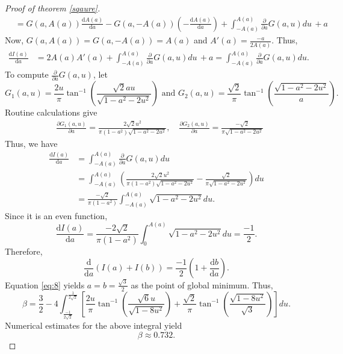 \documentclass[11pt, a4paper]{article}
\theoremstyle{compact}
\begin{document}
\begin{proof}[Proof of theorem \ref{sqaure}]
\begin{align*}
    & = G(a, A(a))\frac{\mathrm{d}A(a)}{\mathrm{d}a} - G(a, -A(a))\left(-\frac{\mathrm{d}A(a)}{\mathrm{d}a}\right) + \int_{-A(a)}^{A(a)}\frac{\partial}{\partial a}G(a, u) du \, + a
\end{align*}
Now, $G(a, A(a)) = G(a, -A(a)) = A(a)$ and $\displaystyle A'(a) = \frac{-a}{2A(a)}$. Thus, 
\begin{align*}
    \frac{\mathrm{d}I(a)}{\mathrm{d}a} & = 2A(a)A'(a) +  \int_{-A(a)}^{A(a)}\frac{\partial}{\partial a}G(a, u) du \, + a 
      =  \int_{-A(a)}^{A(a)}\frac{\partial}{\partial a}G(a, u) du .
\end{align*} 
To compute $\displaystyle \frac{\partial}{\partial a}G(a, u)$, let
\[
G_1(a, u) =  \frac{2u}{\pi}\tan^{-1}\left( \frac{\sqrt{2}au}{\sqrt{1-a^2-2u^2}}\right) \text{ and } G_2(a, u) =\frac{\sqrt{2}}{\pi}\tan^{-1}\left( \frac{\sqrt{1-a^2-2u^2}}{a} \right).
\]
Routine calculations give 
\begin{align*}
   & \frac{\partial G_1(a, u)}{\partial a}  = \frac{2\sqrt{2}u^2}{\pi (1-a^2) \sqrt{1-a^2-2u^2}}, \quad  \frac{\partial G_2(a, u)}{\partial a}  = \frac{-\sqrt{2}}{\pi \sqrt{1-a^2-2u^2}} 
\end{align*}
Thus, we have
\begin{align*}
     \frac{\mathrm{d}I(a)}{\mathrm{d}a} & =  \int_{-A(a)}^{A(a)}\frac{\partial}{\partial a}G(a, u) du \\
      & = \int_{-A(a)}^{A(a)}\left( \frac{2\sqrt{2}u^2}{\pi (1-a^2) \sqrt{1-a^2-2u^2}} - \frac{\sqrt{2}}{\pi \sqrt{1-a^2-2u^2}}  \right)du \\
      & = \frac{-\sqrt{2}}{\pi (1-a^2)}\int_{-A(a)}^{A(a)} \sqrt{1-a^2-2u^2}du.
\end{align*}
Since it is an even function, 
\[
 \frac{\mathrm{d}I(a)}{\mathrm{d}a} =  \frac{-2\sqrt{2}}{\pi (1-a^2)}\int_{0}^{A(a)} \sqrt{1-a^2-2u^2}du = \frac{-1}{2}.
\]
Therefore, 
\[
\frac{\mathrm{d}}{\mathrm{d}a}\left( I(a) + I(b) \right) = \frac{-1}{2}\left( 1+ \frac{\mathrm{d}b}{\mathrm{d}a}\right).
\]
Equation \ref{eq:8} yields $\displaystyle a=b = \frac{\sqrt{3}}{2}$ as the point of global minimum. Thus,
\[
\beta=
\frac{3}{2} - 4\int_{\frac{-1}{2\sqrt{2}}}^{\frac{1}{2\sqrt{2}}}\left[\frac{2u}{\pi}\tan^{-1}\left( \frac{\sqrt{6}u}{\sqrt{1-8u^2}} \right) + \frac{\sqrt{2}}{\pi}\tan^{-1}\left( \frac{\sqrt{1-8u^2}}{\sqrt{3}} \right) \right]du.
\]
Numerical estimates for the above integral yield 
\[
\beta \approx 0.732.
\]


\end{proof}
\end{document}
